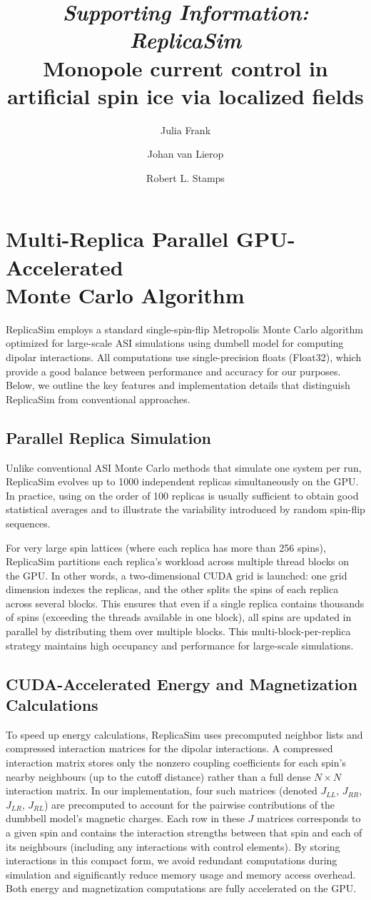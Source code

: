 \documentclass[journal=nalefd,manuscript=letter]{achemso}
\author{Julia Frank}
\affiliation{Department of Physics \& Astronomy, University of Manitoba, Winnipeg, Canada}
\author{Johan van Lierop}
\affiliation{Department of Physics \& Astronomy, University of Manitoba, Winnipeg, Canada}
\author{Robert L. Stamps}
\affiliation{Department of Physics \& Astronomy, University of Manitoba, Winnipeg, Canada}
\title{\emph{Supporting Information: ReplicaSim} \protect\\ Monopole current control in artificial spin ice via localized fields}
\begin{document}
\newpage

\section{Multi-Replica Parallel GPU-Accelerated\\
Monte Carlo Algorithm}
ReplicaSim employs a standard single-spin-flip Metropolis Monte Carlo algorithm optimized for large-scale ASI simulations using dumbell model for computing dipolar interactions. All computations use single-precision floats (Float32), which provide a good balance between performance and accuracy for our purposes. Below, we outline the key features and implementation details that distinguish ReplicaSim from conventional approaches.

\subsection{Parallel Replica Simulation}
Unlike conventional ASI Monte Carlo methods that simulate one system per run, ReplicaSim evolves up to 1000 independent replicas simultaneously on the GPU. In practice, using on the order of 100 replicas is usually sufficient to obtain good statistical averages and to illustrate the variability introduced by random spin-flip sequences.

For very large spin lattices (where each replica has more than 256 spins), ReplicaSim partitions each replica’s workload across multiple thread blocks on the GPU. In other words, a two-dimensional CUDA grid is launched: one grid dimension indexes the replicas, and the other splits the spins of each replica across several blocks. This ensures that even if a single replica contains thousands of spins (exceeding the threads available in one block), all spins are updated in parallel by distributing them over multiple blocks. This multi-block-per-replica strategy maintains high occupancy and performance for large-scale simulations.

\subsection{CUDA-Accelerated Energy and Magnetization Calculations}
To speed up energy calculations, ReplicaSim uses precomputed neighbor lists and compressed interaction matrices for the dipolar interactions. A compressed interaction matrix stores only the nonzero coupling coefficients for each spin’s nearby neighbours (up to the cutoff distance) rather than a full dense $N \times N$ interaction matrix. In our implementation, four such matrices (denoted $J_{LL}$, $J_{RR}$, $J_{LR}$, $J_{RL}$) are precomputed to account for the pairwise contributions of the dumbbell model’s magnetic charges. Each row in these $J$ matrices corresponds to a given spin and contains the interaction strengths between that spin and each of its neighbours (including any interactions with control elements). By storing interactions in this compact form, we avoid redundant computations during simulation and significantly reduce memory usage and memory access overhead.
Both energy and magnetization computations are fully accelerated on the GPU. 
\end{document}

